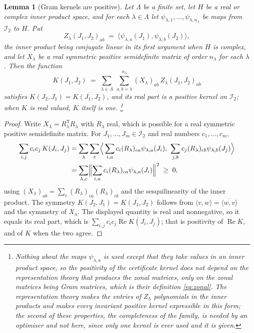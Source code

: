 \documentclass[11pt,reqno]{amsart}
\renewcommand{\_}{\origunderscore\allowbreak}
\numberwithin{equation}{section}
\theoremstyle{plain}
\newtheorem{lem}[thm]{Lemma}
\theoremstyle{definition}
\theoremstyle{remark}
\begin{document}
\begin{lem}[Gram kernels are positive]\label{lem:gram}
Let $\Lambda$ be a finite set, let $H$ be a real or complex inner product
space, and for each $\lambda\in\Lambda$ let
$\psi_{\lambda,1},\dots,\psi_{\lambda,n_\lambda}$ be maps from
$\mathcal I_2$ to $H$. Put
\[
  Z_\lambda(J_1,J_2)_{ab}\;=\;\bigl\langle\psi_{\lambda,a}(J_1),\psi_{\lambda,b}(J_2)\bigr\rangle ,
\]
the inner product being conjugate linear in its first argument when $H$
is complex, and let $X_\lambda$ be a real symmetric positive semidefinite
matrix of order $n_\lambda$ for each $\lambda$. Then the function
\[
  K(J_1,J_2)\;=\;\sum_{\lambda\in\Lambda}\ \sum_{a,b=1}^{n_\lambda}(X_\lambda)_{ab}\,Z_\lambda(J_1,J_2)_{ab}
\]
satisfies $K(J_2,J_1)=\overline{K(J_1,J_2)}$, and its real part is a
positive kernel on $\mathcal I_2$; when $K$ is real valued, $K$ itself is
one.%
\footnote{Nothing about the maps $\psi_{\lambda,a}$ is used except that
  they take values in an inner product space, so the positivity of the
  certificate kernel does not depend on the representation theory that
  produces the zonal matrices, only on the zonal matrices being Gram
  matrices, which is their definition \eqref{eq:zonal}. The
  representation theory makes the entries of $Z_\lambda$
  polynomials in the inner products and makes every invariant
  positive kernel expressible in this form; the second of these
  properties, the completeness of the family, is needed by an optimiser
  and not here, since only one kernel is ever
  used and it is given.}
\end{lem}

\begin{proof}
Write $X_\lambda=R_\lambda^{\mathsf T}R_\lambda$ with $R_\lambda$ real, which
is possible for a real symmetric positive semidefinite matrix. For
$J_1,\dots,J_m\in\mathcal I_2$ and real numbers $c_1,\dots,c_m$,
\begin{align*}
  \sum_{i,j}c_ic_j\,K(J_i,J_j)
  &=\sum_{\lambda}\sum_{c}\Bigl\langle\,\sum_{i,a}c_i(R_\lambda)_{ca}\psi_{\lambda,a}(J_i),\ 
  \sum_{j,b}c_j(R_\lambda)_{cb}\psi_{\lambda,b}(J_j)\Bigr\rangle\\
  &=\sum_{\lambda,c}\Bigl\|\sum_{i,a}c_i(R_\lambda)_{ca}\psi_{\lambda,a}(J_i)\Bigr\|^2\;\ge\;0 ,
\end{align*}
using $(X_\lambda)_{ab}=\sum_c(R_\lambda)_{ca}(R_\lambda)_{cb}$ and the
sesquilinearity of the inner product. The symmetry
$K(J_2,J_1)=\overline{K(J_1,J_2)}$ follows from
$\langle v,w\rangle=\overline{\langle w,v\rangle}$ and the symmetry of
$X_\lambda$. The displayed quantity is real and nonnegative, so it equals
its real part, which is $\sum_{i,j}c_ic_j\operatorname{Re}K(J_i,J_j)$; that
is positivity of $\operatorname{Re}K$, and of $K$ when the two agree.
\end{proof}
\end{document}
